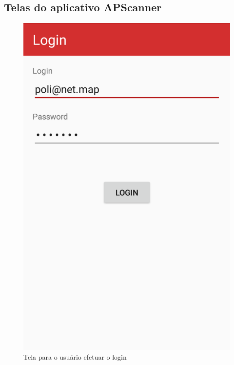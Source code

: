 \chapter{}
\section{Telas do aplicativo APScanner}
\label{anexo:telasApscanner}

\begin{figure}[H]
  \centering
  \begin{minipage}[b]{0.4\textwidth}
    \includegraphics[width=\textwidth]{imagens/screenshots/telaLogin.png}
    \caption{Tela para o usuário efetuar o login}
  \end{minipage}

\end{figure}
